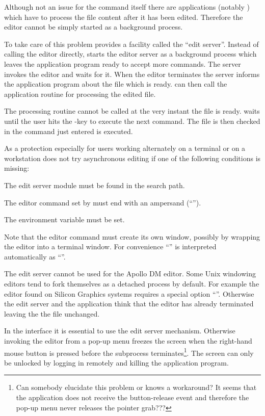 Although not an issue for the  command itself there
are applications (notably \CMZ{}) which have to process the file
content after it has been edited.
Therefore the editor cannot be simply started as a background process.

To take care of this problem \KUIP{} provides a facility called the
``edit server''.
Instead of calling the editor directly, \KUIP{} starts the editor
server as a background process which leaves the application program
ready to accept more commands.
The server invokes the editor and waits for it.
When the editor terminates the server informs the application program
about the file which is ready.
\KUIP{} can then call the application routine for processing the edited
file.

The processing routine cannot be called at the very instant the file
is ready.
\KUIP{} waits until the user hits the -key to execute the
next command.
The file is then checked in  the command just entered is
executed.

As a protection especially for users working alternately on a terminal
or on a workstation \KUIP{} does not try asynchronous editing if one
of the following conditions is missing:
\begin{UL}
\item The edit server module  must be found in the search
path.
\item The editor command set by  must end with an
ampersand (``\Lit{&}''). 
\item The environment variable  must be set.
\end{UL}

Note that the editor command must create its own window, possibly by
wrapping the editor into a terminal window.
For convenience ``'' is interpreted
automatically as ``''.

The edit server cannot be used for the Apollo DM editor.
Some Unix windowing editors tend to fork themselves as a detached process
by default.
For example the  editor found on Silicon Graphics systems
requires a special option ``''.
Otherwise the edit server and the application think that the editor
has already terminated leaving the the file unchanged.

In the \KUIPMotif{} interface it is essential to use the edit server
mechanism.
Otherwise invoking the editor from a pop-up menu freezes the screen
when the right-hand mouse button is pressed before the subprocess
terminates\footnote{
Can somebody elucidate this problem or knows a workaround?
It seems that the application does not receive the button-release
event and therefore the \Motif{} pop-up menu never releases the pointer grab???
}.
The screen can only be unlocked by logging in remotely and killing the
application program.

